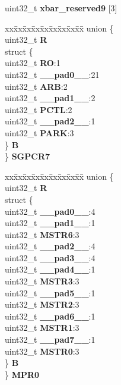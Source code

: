 \begin{DoxyCompactItemize}
\begin{tabbing}
\end{tabbing}\item 
\mbox{\label{structXBAR__tag_ad8696cd920d5cb749f7a420a408b2733}} 
uint32\+\_\+t {\bfseries xbar\+\_\+reserved9} \mbox{[}3\mbox{]}
\item 
\mbox{\label{structXBAR__tag_aaed9c0c138985418899cecca0ba6310a}} 
\begin{tabbing}
xx\=xx\=xx\=xx\=xx\=xx\=xx\=xx\=xx\=\kill
union \{\\
\>uint32\_t {\bfseries R}\\
\>struct \{\\
\>\>uint32\_t {\bfseries RO}:1\\
\>\>uint32\_t {\bfseries \_\_pad0\_\_}:21\\
\>\>uint32\_t {\bfseries ARB}:2\\
\>\>uint32\_t {\bfseries \_\_pad1\_\_}:2\\
\>\>uint32\_t {\bfseries PCTL}:2\\
\>\>uint32\_t {\bfseries \_\_pad2\_\_}:1\\
\>\>uint32\_t {\bfseries PARK}:3\\
\>\} {\bfseries B}\\
\} {\bfseries SGPCR7}\\

\end{tabbing}\item 
\mbox{\label{structXBAR__tag_a9a2de7f70b3a9a80055a32c0cb9322b8}} 
\begin{tabbing}
xx\=xx\=xx\=xx\=xx\=xx\=xx\=xx\=xx\=\kill
union \{\\
\>uint32\_t {\bfseries R}\\
\>struct \{\\
\>\>uint32\_t {\bfseries \_\_pad0\_\_}:4\\
\>\>uint32\_t {\bfseries \_\_pad1\_\_}:1\\
\>\>uint32\_t {\bfseries MSTR6}:3\\
\>\>uint32\_t {\bfseries \_\_pad2\_\_}:4\\
\>\>uint32\_t {\bfseries \_\_pad3\_\_}:4\\
\>\>uint32\_t {\bfseries \_\_pad4\_\_}:1\\
\>\>uint32\_t {\bfseries MSTR3}:3\\
\>\>uint32\_t {\bfseries \_\_pad5\_\_}:1\\
\>\>uint32\_t {\bfseries MSTR2}:3\\
\>\>uint32\_t {\bfseries \_\_pad6\_\_}:1\\
\>\>uint32\_t {\bfseries MSTR1}:3\\
\>\>uint32\_t {\bfseries \_\_pad7\_\_}:1\\
\>\>uint32\_t {\bfseries MSTR0}:3\\
\>\} {\bfseries B}\\
\} {\bfseries MPR0}\\


\end{tabbing}
\end{DoxyCompactItemize}
